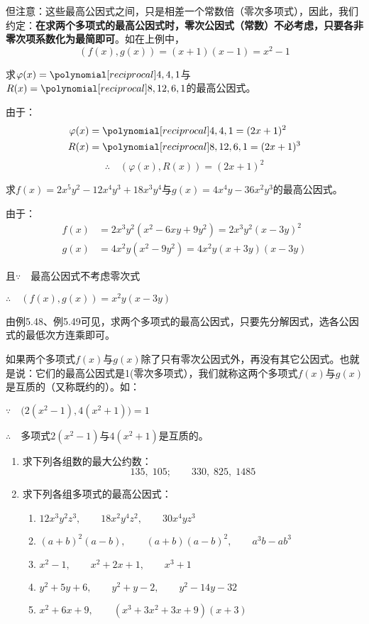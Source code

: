 但注意：这些最高公因式之间，只是相差一个常数倍（零次多项式），因此，我们约定：\textbf{在求两个多项式的最高公因式时，零次公因式（常数）不必考虑，只要各非零次项系数化为最简即可}。如在上例中，
\[(f(x),g(x))=(x+1)(x-1)=x^2-1\]
\begin{example}
求$\varphi(x)=\poly{4,4,1}$与$R(x)=\poly{8,12,6,1}$的最高公因式。
\end{example}

\begin{solution}
由于：\[\begin{split}
    \varphi(x)&=\poly{4,4,1}=(2x+1)^2\\
    R(x)&=\poly{8,12,6,1}=(2x+1)^3
\end{split}\]
\[\therefore\quad (\varphi(x), R(x))=(2x+1)^2\]
\end{solution}


\begin{example}
求$f(x)=2x^5y^2-12x^4y^3+18x^3y^4$与$g(x)=4x^4y-36x^2y^3$的最高公因式。
\end{example}

\begin{solution}
由于：\[\begin{split}
    f(x)&=2x^3y^2 (x^2-6xy+9y^2)=2x^3y^2(x-3y)^2\\
    g(x)&=4x^2y(x^2-9y^2)=4x^2y(x+3y)(x-3y)
\end{split}\]
\end{solution}
且$\because\quad $最高公因式不考虑零次式

$\therefore\quad (f(x),g(x))=x^2y(x-3y)$

由例5.48、例5.49可见，求两个多项式的最高公因式，只要先分解因式，选各公因式的最低次方连乘即可。

如果两个多项式$f(x)$与$g(x)$除了只有零次公因式外，再没有其它公因式。也就是说：它们的最高公因式是1(零次多项式），我们就称这两个多项式$f(x)$与$g(x)$是互质的（又称既约的）。如：

$\because\quad \big(2 (x^2-1) , 4 (x^2+1) \big) =1$

$\therefore\quad $多项式$2(x^2-1)$与$4(x^2+1)$是互质的。

\begin{ex}
\begin{enumerate}
    \item 求下列各组数的最大公约数：
    \[135,\; 105;\qquad 330,\; 825,\; 1485\]
    \item 求下列各组多项式的最高公因式：
\begin{enumerate}
    \item $12x^3y^2z^3,\qquad 18x^2y^4z^2,\qquad 30x^4yz^3$
    \item $(a+b)^2(a-b),\qquad (a+b)(a-b)^2,\qquad a^3b-ab^3$
    \item $x^2-1,\qquad x^2+2x+1,\qquad x^3+1$
    \item $y^2+5y+6,\qquad y^2+y-2,\qquad y^2-14y-32$
    \item $x^2+6x+9,\qquad (x^3+3x^2+3x+9)(x+3)$
\end{enumerate}
\end{enumerate}    
\end{ex}

